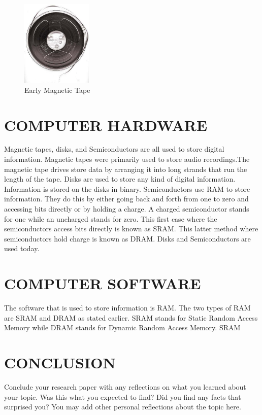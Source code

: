 \documentclass[letterpaper, 10 pt, conference]{IEEEconf}
\begin{document}

\begin{figure}[h!]
\centering
\includegraphics[width=0.3\textwidth]{Magtape1.jpg}
\caption{Early Magnetic Tape}
\label{fig:example}
\end{figure} 

\section{COMPUTER HARDWARE}
Magnetic tapes, disks, and Semiconductors are all used to store digital information. Magnetic tapes were primarily used to store audio recordings.The magnetic tape drives store data by arranging it into long strands that run the length of the tape. Disks are used to store any kind of digital information. Information is stored on the disks in binary. Semiconductors use RAM to store information. They do this by either going back and forth from one to zero and accessing bits directly or by holding a charge. A charged semiconductor stands for one while an uncharged stands for zero. This first case where the semiconductors access bits directly is known as SRAM. This latter method where semiconductors hold charge is known as DRAM. Disks and Semiconductors are used today. 

\section{COMPUTER SOFTWARE}
The software that is used to store information is RAM. The two types of RAM are SRAM and DRAM as stated earlier. SRAM stands for Static Random Access Memory while DRAM stands for Dynamic Random Access Memory.
SRAM 

\section{CONCLUSION}

Conclude your research paper with any reflections on what you
learned about your topic. Was this what you expected to find?
Did you find any facts that surprised you? You may add other
personal reflections about the topic here.
\end{document}
